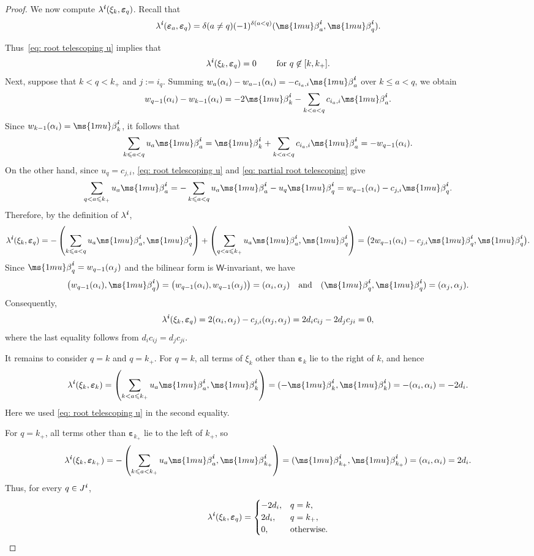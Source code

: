 \documentclass[12pt, leqno]{amsart}
\numberwithin{equation}{section}
\theoremstyle{plain}
\theoremstyle{definition}
\renewcommand{\le}{\leqslant}
\newcommand{\seteq}{\mathbin{:=}}
\newcommand{\be}{{\ms{1mu}\beta}}
\newcommand{\ve}{\boldsymbol{\varepsilon}}
\newcommand{\ii}{ \textbf{\textit{i}}}
\newcommand{\sfW}{\mathsf{W}}
\newcommand{\qtq}[1][{and}]{\quad\text{{#1}}\quad}
\begin{document}
\begin{proof}
We now compute $\lambda^\ii(\xi_k,\ve_q)$. Recall that
\[
\lambda^\ii(\ve_a,\ve_q) = \delta(a \ne q) (-1)^{\delta(a<q)} (\be_a^\ii,\be_q^\ii).
\]

Thus~\eqref{eq: root telescoping u} implies that
\[
\lambda^\ii(\xi_k,\ve_q) = 0 \qquad \text{ for $q \not\in [k,k_+]$}.
\]
Next, suppose that $k<q<k_+$ and  $j\seteq i_q$. Summing
$w_a(\alpha_i)-w_{a-1}(\alpha_i) = -c_{i_a,i}\be_a^\ii$
over $k\le a<q$, we obtain
\[
w_{q-1}(\alpha_i)-w_{k-1}(\alpha_i) = -2\be_k^\ii -\sum_{k<a<q}c_{i_a,i}\be_a^\ii.
\]
Since $w_{k-1}(\alpha_i)=\be_k^\ii$, it follows that
\begin{equation}\label{eq: partial root telescoping}
\sum_{k\le a<q}u_a\be_a^\ii = \be_k^\ii +\sum_{k<a<q}c_{i_a,i}\be_a^\ii  = -w_{q-1}(\alpha_i).
\end{equation}
On the other hand, since $u_q=c_{j,i}$,
\eqref{eq: root telescoping u} and
\eqref{eq: partial root telescoping} give
\[
\sum_{q<a\le k_+}u_a\be_a^\ii
= -\sum_{k\le a<q}u_a\be_a^\ii -u_q\be_q^\ii
= w_{q-1}(\alpha_i)-c_{j,i}\be_q^\ii.
\]
Therefore, by the definition of $\lambda^\ii$,
\[
\lambda^\ii(\xi_k,\ve_q) =
-\left(\sum_{k\le a<q}u_a\be_a^\ii, \be_q^\ii \right) + \left( \sum_{q<a\le k_+}u_a\be_a^\ii, \be_q^\ii \right)
= \bigl( 2w_{q-1}(\alpha_i)-c_{j,i}\be_q^\ii, \be_q^\ii \bigr).
\]
Since $\be_q^\ii=w_{q-1}(\alpha_j)$ and the bilinear form is $\sfW$-invariant, we have
\[
\bigl(w_{q-1}(\alpha_i),\be_q^\ii\bigr) = \bigl(w_{q-1}(\alpha_i),w_{q-1}(\alpha_j)\bigr) = (\alpha_i,\alpha_j)
\qtq
(\be_q^\ii,\be_q^\ii) = (\alpha_j,\alpha_j).
\]
Consequently,
\[
\lambda^\ii(\xi_k,\ve_q) = 2(\alpha_i,\alpha_j) -c_{j,i}(\alpha_j,\alpha_j)  = 2d_ic_{ij}-2d_jc_{ji} =0,
\]
where the last equality follows from $d_ic_{ij}=d_jc_{ji}$.

It remains to consider $q=k$ and $q=k_+$. For $q=k$, all terms of
$\xi_k$ other than $\ve_k$ lie to the right of $k$, and hence
\[
\lambda^\ii(\xi_k,\ve_k) = \left( \sum_{k<a\le k_+}u_a\be_a^\ii, \be_k^\ii \right) = (-\be_k^\ii,\be_k^\ii) = -(\alpha_i,\alpha_i) = -2d_i.
\]
Here we used \eqref{eq: root telescoping u} in the second equality.

For $q=k_+$, all terms other than $\ve_{k_+}$ lie to the left of
$k_+$, so
\[
\lambda^\ii(\xi_k,\ve_{k_+}) = -\left( \sum_{k\le a<k_+}u_a\be_a^\ii, \be_{k_+}^\ii \right) = (\be_{k_+}^\ii,\be_{k_+}^\ii) = (\alpha_i,\alpha_i) = 2d_i.
\]
Thus, for every $q\in J^\ii$,
\begin{equation}\label{eq: lambda xi basis}
\lambda^\ii(\xi_k,\ve_q)
=
\begin{cases}
-2d_i,&q=k,\\
2d_i,&q=k_+,\\
0,&\text{otherwise}.
\end{cases}
\end{equation}


\end{proof}
\end{document}
